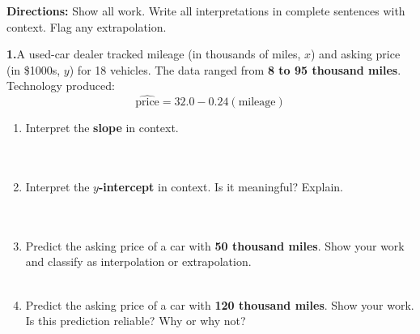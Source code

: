 \documentclass[10pt]{article}
\begin{document}
\namedateperiod

\vspace{0.18in}

\noindent\textbf{Directions:} Show all work. Write all interpretations in complete sentences
with context. Flag any extrapolation.

\vspace{0.14in}

\noindent\textbf{1.}\enspace A used-car dealer tracked mileage (in thousands of miles, $x$)
and asking price (in \$1000s, $y$) for 18 vehicles. The data ranged from \textbf{8 to 95
thousand miles}. Technology produced:
\[
  \widehat{\text{price}} = 32.0 - 0.24(\text{mileage})
\]

\begin{enumerate}[label=\textbf{(\alph*)}, leftmargin=2em, itemsep=0.18in]

  \item Interpret the \textbf{slope} in context.\\[8pt]
        \writeline\\[3pt]\writeline\\[3pt]\writeline

  \item Interpret the \textbf{$y$-intercept} in context. Is it meaningful? Explain.\\[8pt]
        \writeline\\[3pt]\writeline\\[3pt]\writeline

  \item Predict the asking price of a car with \textbf{50 thousand miles}. Show your work and
        classify as interpolation or extrapolation.\\[8pt]
        \writeline\\[3pt]\writeline

  \item Predict the asking price of a car with \textbf{120 thousand miles}. Show your work.
        Is this prediction reliable? Why or why not?\\[8pt]
        \writeline\\[3pt]\writeline\\[3pt]\writeline

\end{enumerate}
\end{document}
